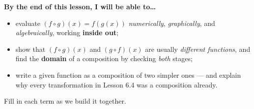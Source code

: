 \documentclass[10pt]{article}
\begin{document}
\namedateperiod

\vspace{0.08in}

\begin{objectivebox}
\textbf{By the end of this lesson, I will be able to\dots}
\begin{itemize}\setlength{\itemsep}{2pt}
  \item evaluate $(f\circ g)(x)=f(g(x))$ \emph{numerically}, \emph{graphically}, and \emph{algebraically}, working \textbf{inside out};
  \item show that $(f\circ g)(x)$ and $(g\circ f)(x)$ are usually \emph{different functions}, and find the \textbf{domain} of a composition by checking \emph{both} stages;
  \item write a given function as a composition of two simpler ones --- and explain why every transformation in Lesson 6.4 was a composition already.
\end{itemize}
\end{objectivebox}

\vspace{0.05in}

\begin{vocabbox}
\small
Fill in each term as we build it together.
\par\vspace{2pt}   %
\end{vocabbox}
\end{document}
